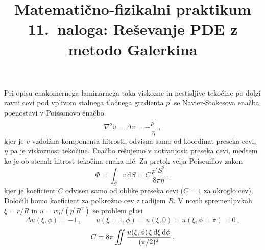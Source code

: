 \documentclass[slovene,11pt,a4paper]{article}
\title{
\sc\large Matematično-fizikalni praktikum \thisyear\\
\bigskip
\bf\Large 11.~naloga: Reševanje PDE z metodo Galerkina
}
\author{}
\date{}
\newcommand{\dd}{\,\mathrm{d}}
\renewcommand{\iint}{\mathop{\int\mkern-13mu\int}}
\begin{document}
\maketitle
\vspace{-1cm}

Pri opisu enakomernega laminarnega toka viskozne in nestisljive
tekočine po dolgi ravni cevi pod vplivom stalnega tlačnega
gradienta $p^{\prime}$ se Navier-Stokesova enačba poenostavi
v Poissonovo enačbo
\begin{equation*}
  \nabla^2 v = \Delta v = - \frac{p^\prime}{\eta}\>,
\end{equation*}
kjer je $v$ vzdolžna komponenta hitrosti, odvisna samo  od
koordinat preseka cevi, $\eta$ pa je viskoznost tekočine.
Enačbo rešujemo v notranjosti preseka cevi, medtem ko
je ob stenah hitrost tekočina enaka nič.  Za pretok velja
Poiseuillov zakon
\begin{equation*}
  \Phi = \int_S v\dd S = C\,\frac{p' S^2}{ 8\pi\eta} \>,
\end{equation*}
kjer je koeficient $C$ odvisen samo od oblike preseka cevi
($C=1$ za okroglo cev).  Določili bomo koeficient za
polkrožno cev z radijem $R$. V novih spremenljivkah $\xi=r/R$
in $u=v \eta/(p^\prime R^2)$ se problem glasi
\begin{equation*}
\Delta u(\xi,\phi) = -1 \>,\qquad
u(\xi=1,\phi)=u(\xi,0)=u(\xi,\phi=\pi)=0 \>,
\end{equation*}
\begin{equation*}
  C = 8\pi \iint \frac{u(\xi,\phi)\,\xi\dd \xi \dd\phi}{ (\pi/2)^2} \>.
\end{equation*}
\end{document}

